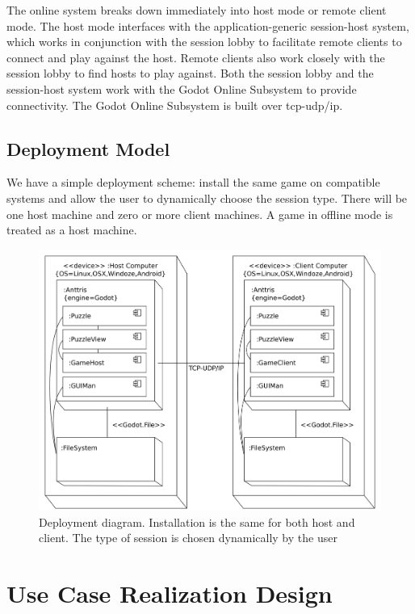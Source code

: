 \documentclass[12pt]{article}
\begin{document}
The online system breaks down immediately into host mode or remote client mode. The host
mode interfaces with the application-generic session-host system, which works in conjunction
with the session lobby to facilitate remote clients to connect and play against the host.
Remote clients also work closely with the session lobby to find hosts to play against. Both
the session lobby and the session-host system work with the Godot Online Subsystem to provide
connectivity. The Godot Online Subsystem is built over tcp-udp/ip.

\subsection{Deployment Model}
We have a simple deployment scheme: install the same game on compatible systems
and allow the user to dynamically choose the session type. There will be
one host machine and zero or more client machines. A game in offline mode is
treated as a host machine.
    \begin{figure}[H]
        \centering
        \includegraphics[width=6in]{deployment_diagram.png}
        \caption{Deployment diagram. Installation is the same for both host and
        client. The type of session is chosen dynamically by the user}
    \end{figure}

\section{Use Case Realization Design}
\end{document}
